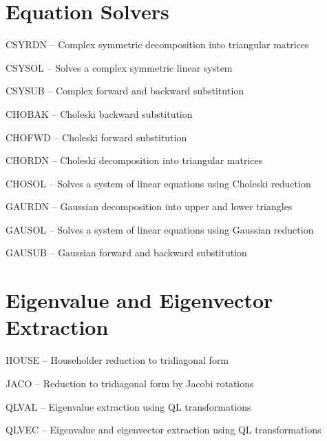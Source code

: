 \section{Equation Solvers}
\begin{list}{}{\leftmargin=57pt }
\item[CSYRDN \hfill] -- Complex symmetric decomposition into triangular matrices
\item[CSYSOL \hfill] -- Solves a complex symmetric linear system
\item[CSYSUB \hfill] -- Complex forward and backward substitution
\item[CHOBAK \hfill] -- Choleski backward substitution
\item[CHOFWD \hfill] -- Choleski forward substitution
\item[CHORDN \hfill] -- Choleski decomposition into triangular matrices
\item[CHOSOL \hfill] -- Solves a system of linear equations using Choleski reduction
\item[GAURDN \hfill] -- Gaussian decomposition into upper and lower triangles
\item[GAUSOL \hfill] -- Solves a system of linear equations using Gaussian reduction
\item[GAUSUB \hfill] -- Gaussian forward and backward substitution
\end{list}
\section{Eigenvalue and Eigenvector Extraction}
\begin{list}{}{\leftmargin=57pt }
\item[HOUSE \hfill]  -- Householder reduction to tridiagonal form
\item[JACO \hfill]   -- Reduction to tridiagonal form by Jacobi rotations
\item[QLVAL \hfill]  -- Eigenvalue extraction using QL transformations
\item[QLVEC \hfill]  -- Eigenvalue and eigenvector extraction using QL transformations
\end{list}
